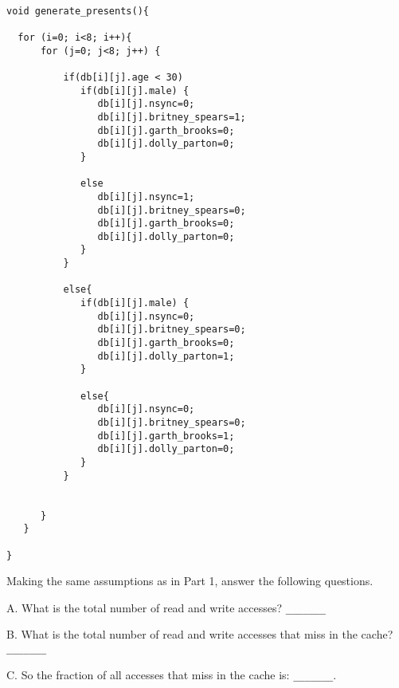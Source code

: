 {\small
\begin{verbatim}
 
void generate_presents(){
 
  for (i=0; i<8; i++){
      for (j=0; j<8; j++) {
 
          if(db[i][j].age < 30)
             if(db[i][j].male) {
                db[i][j].nsync=0;
                db[i][j].britney_spears=1;
                db[i][j].garth_brooks=0;
                db[i][j].dolly_parton=0;
             }
                                                       
             else  
                db[i][j].nsync=1;
                db[i][j].britney_spears=0;
                db[i][j].garth_brooks=0;
                db[i][j].dolly_parton=0;                     
             }
          }                                             

          else{
             if(db[i][j].male) {
                db[i][j].nsync=0;
                db[i][j].britney_spears=0;
                db[i][j].garth_brooks=0;
                db[i][j].dolly_parton=1;
             }
 
             else{
                db[i][j].nsync=0;
                db[i][j].britney_spears=0;
                db[i][j].garth_brooks=1;
                db[i][j].dolly_parton=0;
             }
          }                                           


      }
   }
 
}
\end{verbatim}}                     

Making the same assumptions as in Part 1, answer the following questions.

A. What is the total number of read and write accesses? \verb|_______| 

 
B. What is the total number of read and write accesses that
miss in the cache? \verb|_______| 

 
C. So the fraction of all accesses that miss in the cache is: \verb|_______|.

                                                                   

